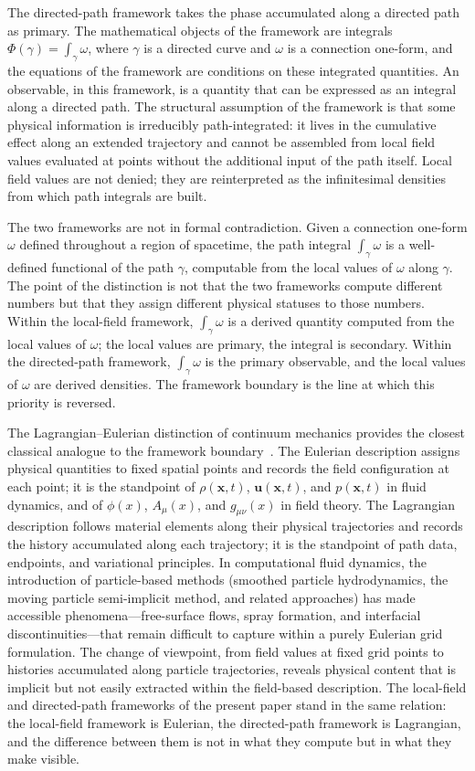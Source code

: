 \documentclass[%
 reprint, amsmath,amssymb, aps, prb, ]{revtex4-2}
\numberwithin{equation}{section}
\begin{document}
The directed-path framework takes the phase accumulated along a directed path as primary. The mathematical objects of the framework are integrals $\Phi(\gamma) = \int_\gamma \omega$, where $\gamma$ is a directed curve and $\omega$ is a connection one-form, and the equations of the framework are conditions on these integrated quantities. An observable, in this framework, is a quantity that can be expressed as an integral along a directed path. The structural assumption of the framework is that some physical information is irreducibly path-integrated: it lives in the cumulative effect along an extended trajectory and cannot be assembled from local field values evaluated at points without the additional input of the path itself. Local field values are not denied; they are reinterpreted as the infinitesimal densities from which path integrals are built.

The two frameworks are not in formal contradiction. Given a connection one-form $\omega$ defined throughout a region of spacetime, the path integral $\int_\gamma \omega$ is a well-defined functional of the path $\gamma$, computable from the local values of $\omega$ along $\gamma$. The point of the distinction is not that the two frameworks compute different numbers but that they assign different physical statuses to those numbers. Within the local-field framework, $\int_\gamma \omega$ is a derived quantity computed from the local values of $\omega$; the local values are primary, the integral is secondary. Within the directed-path framework, $\int_\gamma \omega$ is the primary observable, and the local values of $\omega$ are derived densities. The framework boundary is the line at which this priority is reversed.

The Lagrangian--Eulerian distinction of continuum mechanics provides the closest classical analogue to the framework boundary~\cite{hanamura55}. The Eulerian description assigns physical quantities to fixed spatial points and records the field configuration at each point; it is the standpoint of $\rho(\mathbf{x},t)$, $\mathbf{u}(\mathbf{x},t)$, and $p(\mathbf{x},t)$ in fluid dynamics, and of $\phi(x)$, $A_\mu(x)$, and $g_{\mu\nu}(x)$ in field theory. The Lagrangian description follows material elements along their physical trajectories and records the history accumulated along each trajectory; it is the standpoint of path data, endpoints, and variational principles. In computational fluid dynamics, the introduction of particle-based methods (smoothed particle hydrodynamics, the moving particle semi-implicit method, and related approaches) has made accessible phenomena---free-surface flows, spray formation, and interfacial discontinuities---that remain difficult to capture within a purely Eulerian grid formulation. The change of viewpoint, from field values at fixed grid points to histories accumulated along particle trajectories, reveals physical content that is implicit but not easily extracted within the field-based description. The local-field and directed-path frameworks of the present paper stand in the same relation: the local-field framework is Eulerian, the directed-path framework is Lagrangian, and the difference between them is not in what they compute but in what they make visible.
\end{document}
